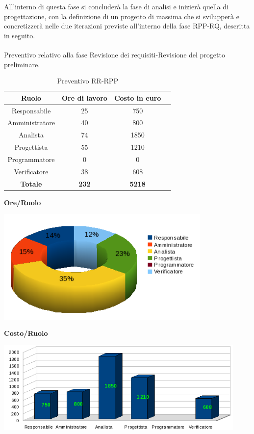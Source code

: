 \newpage

All'interno di questa fase si concluder\`a la fase di analisi e inizier\`a quella di progettazione, con la definizione di un progetto di massima che si svilupper\`a e concretizzer\`a nelle due iterazioni previste all'interno della fase RPP-RQ, descritta in seguito. \\
\\
Preventivo relativo alla fase Revisione dei requisiti-Revisione del progetto preliminare.
\begin{table}[h]
	\begin{center}
		  \begin{tabular}{|c|c|c|c|}
		 \hline 
		 \textbf{Ruolo} & \textbf{Ore di lavoro} & \textbf{Costo in euro}\\
		 \hline
		Responsabile & 25 & 750 \\
		Amministratore & 40 & 800\\
		Analista & 74 & 1850\\
		Progettista & 55 & 1210\\
		Programmatore & 0 & 0 \\
		Verificatore & 38 & 608\\
        \hline
        \textbf{Totale} & \textbf{232} & \textbf{5218}\\
		\hline
		\end{tabular}
	\caption{Preventivo RR-RPP} 
	\label{tab:tabella_RR-RPP}
	\end{center}	
\end{table}

\newpage
\begin{center}\textbf{Ore/Ruolo}
\end{center}
\includegraphics[width=300pt]{RR_RPP_Ore}

\begin{center}\textbf{Costo/Ruolo}
\end{center}
\includegraphics[width=350pt]{RR_RPP_Costi}
\newpage

